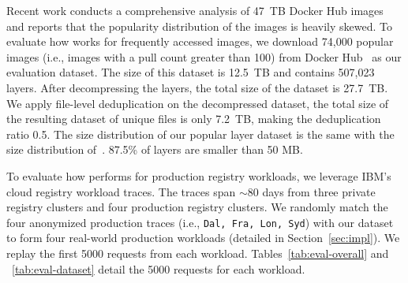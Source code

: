 Recent work \cite{analysisdockergithub} conducts a comprehensive analysis of 47~TB Docker Hub images and reports that the popularity distribution of the images is heavily skewed.
To evaluate how \sysname works for frequently accessed images, we download 74,000 popular images (i.e., images with a pull count greater than 100) from Docker Hub~\cite{docker-hub} as our evaluation dataset. 
The size of this dataset is 12.5~TB and contains 507,023 layers. 
After decompressing the layers, the total size of the dataset is 27.7~TB.
We apply file-level deduplication on the decompressed dataset, 
the total size of the resulting dataset of unique files is only 7.2~TB, making the deduplication ratio 0.5.
The size distribution of our popular layer dataset is the same with the size distribution of~\cite{analysisdockergithub}.
87.5\% of layers are smaller than 50 MB.
  
To evaluate how \sysname performs for production registry workloads, we leverage IBM's cloud registry workload traces\cite{dockerworkload}. 
The traces span $\sim$80 days from three private registry clusters and four production registry clusters. 
We randomly match the four anonymized production traces (i.e., \texttt{Dal, Fra, Lon, Syd}) 
with our dataset to form four real-world production workloads (detailed in Section~\ref{sec:impl}). 
We replay the first 5000 requests from each workload.
Tables~\ref{tab:eval-overall} and ~\ref{tab:eval-dataset} detail the 5000 requests for each workload.




%
%